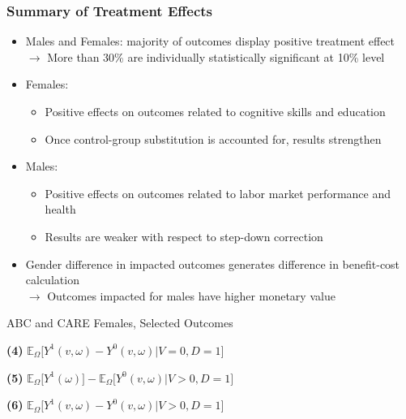 \documentclass[static]{JJH-Beamer}
\newcommand*\leftright[2]{%
  \leavevmode
  \rlap{#1}%
  \hspace{0.5\linewidth}%
  #2}
\begin{document}

\begin{frame}
\frametitle{Summary of Treatment Effects}
\begin{itemize}
	\item Males and Females: majority of outcomes display positive treatment effect 
	$\rightarrow$ More than 30\% are individually statistically significant at 10\% level
	\item Females: 
		\begin{itemize}
			\item Positive effects on outcomes related to cognitive skills and education
			\item Once control-group substitution is accounted for, results strengthen
		\end{itemize}
	\item Males:
		\begin{itemize}
			\item Positive effects on outcomes related to labor market performance and health
			\item Results are weaker with respect to step-down correction
		\end{itemize}
	\item Gender difference in impacted outcomes generates difference in benefit-cost calculation \\
		$\rightarrow$ Outcomes impacted for males have higher monetary value
	\end{itemize}
\end{frame}	


\begin{frame} \label{resultsfemales}
\begin{table}
	\caption{ABC and CARE Females, Selected Outcomes}
	\scalebox{0.7}{}
\end{table}
\begin{tiny}
\leftright{\textbf{(1)} $\mathbb{E}_\Omega \big[ Y^1(\omega) - Y^0(\omega) | D = 1\big]$}{\textbf{(4)} $\mathbb{E}_\Omega \big[ Y^1(v, \omega) - Y^0(v, \omega) | V=0, D = 1 \big] $} \par
\leftright{\textbf{(2)} $\mathbb{E}_\Omega \big[ Y^1(\omega) - Y^0(\omega) |  X, D = 1 \big]$}{\textbf{(5)} $\mathbb{E}_\Omega \big[ Y^1(\omega) \big] - \mathbb{E}_\Omega \big[ Y^0(v, \omega) | V > 0, D =1 \big]$} \par
\leftright{\textbf{(3)} $\mathbb{E}_\Omega \big[ Y^1(\omega) \big] - \mathbb{E}_\Omega \big[ Y^0(v, \omega) | V =0, D =1 \big]$}{\textbf{(6)} $\mathbb{E}_\Omega \big[ Y^1(v, \omega) - Y^0(v, \omega) | V > 0 , D = 1\big]$}

\end{tiny}
\hyperlink{stepdownfemales}{} \hyperlink{royfemales}{}
\end{frame}
\end{document}

